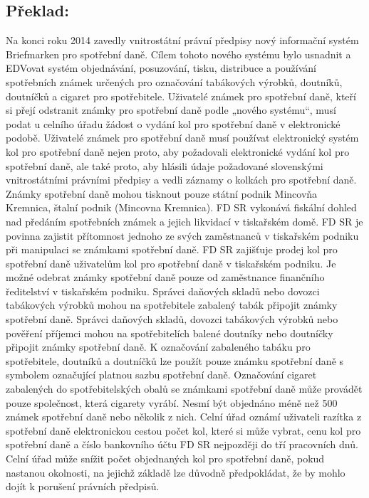 \documentclass[10pt]{article}
\begin{document}
\subsection*{Překlad:}

Na konci roku 2014 zavedly vnitrostátní právní předpisy nový informační systém Briefmarken pro spotřební daně.
Cílem tohoto nového systému bylo usnadnit a EDVovat systém objednávání, posuzování, tisku, distribuce a používání spotřebních známek určených pro označování tabákových výrobků, doutníků, doutníčků a cigaret pro spotřebitele.
Uživatelé známek pro spotřební daně, kteří si přejí odstranit známky pro spotřební daně podle „nového systému“, musí podat u celního úřadu žádost o vydání kol pro spotřební daně v elektronické podobě.
Uživatelé známek pro spotřební daně musí používat elektronický systém kol pro spotřební daně nejen proto, aby požadovali elektronické vydání kol pro spotřební daně, ale také proto, aby hlásili údaje požadované slovenskými vnitrostátními právními předpisy a vedli záznamy o kolkách pro spotřební daně.
Známky spotřební daně mohou tisknout pouze státní podnik Mincovňa Kremnica, štalní podnik (Mincovna Kremnica).
FD SR vykonává fiskální dohled nad předáním spotřebních známek a jejich likvidací v tiskařském domě.
FD SR je povinna zajistit přítomnost jednoho ze svých zaměstnanců v tiskařském podniku při manipulaci se známkami spotřební daně.
FD SR zajišťuje prodej kol pro spotřební daně uživatelům kol pro spotřební daně v tiskařském podniku.
Je možné odebrat známky spotřební daně pouze od zaměstnance finančního ředitelství v tiskařském podniku.
Správci daňových skladů nebo dovozci tabákových výrobků mohou na spotřebitele zabalený tabák připojit známky spotřební daně.
Správci daňových skladů, dovozci tabákových výrobků nebo pověření příjemci mohou na spotřebitelích balené doutníky nebo doutníčky připojit známky spotřební daně.
K označování zabaleného tabáku pro spotřebitele, doutníků a doutníčků lze použít pouze známku spotřební daně s symbolem označující platnou sazbu spotřební daně.
Označování cigaret zabalených do spotřebitelských obalů se známkami spotřební daně může provádět pouze společnost, která cigarety vyrábí.
Nesmí být objednáno méně než 500 známek spotřební daně nebo několik z nich.
Celní úřad oznámí uživateli razítka z spotřební daně elektronickou cestou počet kol, které si může vybrat, cenu kol pro spotřební daně a číslo bankovního účtu FD SR nejpozději do tří pracovních dnů.
Celní úřad může snížit počet objednaných kol pro spotřební daně, pokud nastanou okolnosti, na jejichž základě lze důvodně předpokládat, že by mohlo dojít k porušení právních předpisů.
\end{document}
